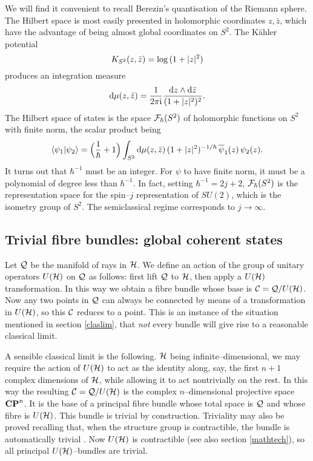 \documentclass[a4paper,a4paper]{article}
\begin{document}
We will find it convenient to recall Berezin's quantisation 
\cite{BEREZIN} of the Riemann sphere. The Hilbert space is most easily presented 
in holomorphic coordinates $z, \bar z$, which have the advantage of being almost 
global coordinates on  $S^2$. The K\"ahler potential 
\begin{equation}
K_{S^2}(z,\bar z)={\rm log}\,(1+|z|^2)
\label{sphpot}
\end{equation}
produces an integration measure 
\begin{equation}
{\rm d}\mu(z,\bar z)={1\over 2\pi {\rm i}}{{\rm d} z\wedge {\rm d}\bar z\over (1+|z|^2)^2}.
\label{sphmea}
\end{equation}
The Hilbert space of states is the space ${\cal F}_{\hbar}(S^2)$ of holomorphic functions on
$S^2$ with finite norm, the scalar product being
\begin{equation}
\langle\psi_1|\psi_2\rangle =\Big({1\over \hbar} +1\Big)\int_{S^2}{\rm d}\mu(z,\bar
z)\,(1+|z|^2)^{-1/\hbar}\,{\overline
\psi_1(z)}\,\psi_2(z).
\label{sphscalar}
\end{equation} 
It turns out that $\hbar^{-1}$ must be an integer. For $\psi$ to have finite
norm, it must be a polynomial of degree less than $\hbar^{-1}$. In fact, setting $\hbar^{-1}=2j+2$, 
${\cal F}_{\hbar}(S^2)$ is the representation space for the spin--$j$ representation of $SU(2)$,
which is the isometry group of $S^2$. 
The semiclassical regime corresponds to $j\to\infty$. 

\subsection{Trivial fibre bundles: global coherent states}\label{triexam}

Let ${\cal Q}$ be the manifold of rays in ${\cal H}$.
We define an action of the group of unitary operators $U({\cal H})$
on ${\cal Q}$ as follows: first lift ${\cal Q}$ to ${\cal H}$, 
then apply a $U({\cal H})$ transformation. In this way 
we obtain a fibre bundle whose base is ${\cal C}={\cal Q}/U({\cal H})$.
Now any two points in ${\cal Q}$ can always be connected by means of a 
transformation in $U({\cal H})$, so this ${\cal C}$ reduces to a point. 
This is an instance of the situation mentioned in section \ref{claslim}, 
that {\it not} every bundle will give rise to a reasonable classical limit.

A sensible classical limit is the following. ${\cal H}$ being infinite--dimensional, 
we may require the action of $U({\cal H})$ to act as the identity along, say, the 
first $n+1$ complex dimensions of ${\cal H}$, while allowing it to act nontrivially on 
the rest. In this way the resulting ${\cal C}={\cal Q}/U({\cal H})$ is the complex 
$n$--dimensional projective space ${\bf CP}^n$. It is the base of a 
principal fibre bundle whose total space is ${\cal Q}$ and whose fibre is $U({\cal H})$.
This bundle is trivial by construction. Triviality may also be proved 
recalling that, when the structure group is contractible, the bundle is 
automatically trivial \cite{STEENROD}. Now $U({\cal H})$ is contractible \cite{KUIPER} 
(see also section \ref{mathtech}), so all principal $U({\cal H})$--bundles 
are trivial.
\end{document}
